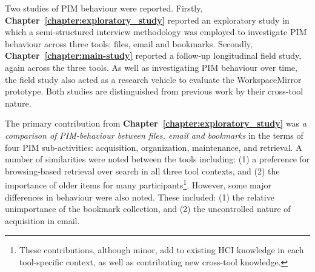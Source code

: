 Two studies of PIM behaviour were reported.  Firstly, \textbf{Chapter~\ref{chapter:exploratory_study}} reported an exploratory study in which a semi-structured interview methodology was employed to investigate PIM behaviour across three tools: files, email and bookmarks.   Secondly, \textbf{Chapter~\ref{chapter:main-study}} reported a follow-up longitudinal field study, again across the three tools. As well as investigating PIM behaviour over time, the field study also acted as a research vehicle to evaluate the WorkspaceMirror prototype.  Both studies are distinguished from previous work by their cross-tool nature.

The primary contribution from \textbf{Chapter~\ref{chapter:exploratory_study}} was \textit{a comparison of PIM-behaviour between files, email and bookmarks} in the terms of four PIM sub-activities: acquisition, organization, maintenance, and retrieval. A number of similarities were noted between the tools including: (1) a preference for browsing-based retrieval over search in all three tool contexts, and (2) the importance of older items for many participants\footnote{These contributions, although minor, add to existing HCI knowledge in each tool-specific context, as well as contributing new cross-tool knowledge.}.  However, some major differences in behaviour were also noted.  These included: (1) the relative unimportance of the bookmark collection, and (2) the uncontrolled nature of acquisition in email.

